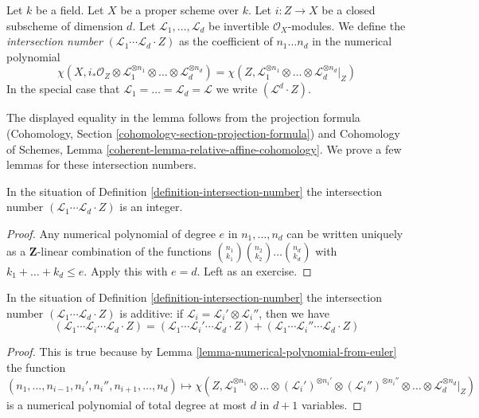 \begin{definition}
\label{definition-intersection-number}
Let $k$ be a field. Let $X$ be a proper scheme over $k$. Let
$i : Z \to X$ be a closed subscheme of dimension $d$. Let
$\mathcal{L}_1, \ldots, \mathcal{L}_d$ be invertible
$\mathcal{O}_X$-modules. We define the {\it intersection number}
$(\mathcal{L}_1 \cdots \mathcal{L}_d \cdot Z)$
as the coefficient of $n_1 \ldots n_d$ in the numerical polynomial
$$
\chi(X, i_*\mathcal{O}_Z \otimes \mathcal{L}_1^{\otimes n_1} \otimes
\ldots \otimes \mathcal{L}_d^{\otimes n_d}) =
\chi(Z, \mathcal{L}_1^{\otimes n_1} \otimes
\ldots \otimes \mathcal{L}_d^{\otimes n_d}|_Z)
$$
In the special
case that $\mathcal{L}_1 = \ldots = \mathcal{L}_d = \mathcal{L}$
we write $(\mathcal{L}^d \cdot Z)$.
\end{definition}

\noindent
The displayed equality in the lemma follows from
the projection formula
(Cohomology, Section \ref{cohomology-section-projection-formula}) and
Cohomology of Schemes, Lemma
\ref{coherent-lemma-relative-affine-cohomology}.
We prove a few lemmas for these intersection numbers.

\begin{lemma}
\label{lemma-intersection-number-integer}
In the situation of Definition \ref{definition-intersection-number}
the intersection number
$(\mathcal{L}_1 \cdots \mathcal{L}_d \cdot Z)$
is an integer.
\end{lemma}

\begin{proof}
Any numerical polynomial of degree $e$ in $n_1, \ldots, n_d$ can be
written uniquely as a $\mathbf{Z}$-linear combination of the functions
${n_1 \choose k_1}{n_2 \choose k_2} \ldots {n_d \choose k_d}$ with
$k_1 + \ldots + k_d \leq e$. Apply this with $e = d$.
Left as an exercise.
\end{proof}

\begin{lemma}
\label{lemma-intersection-number-additive}
In the situation of Definition \ref{definition-intersection-number}
the intersection number
$(\mathcal{L}_1 \cdots \mathcal{L}_d \cdot Z)$
is additive: if $\mathcal{L}_i = \mathcal{L}_i' \otimes \mathcal{L}_i''$,
then we have
$$
(\mathcal{L}_1 \cdots \mathcal{L}_i \cdots \mathcal{L}_d \cdot Z) =
(\mathcal{L}_1 \cdots \mathcal{L}_i' \cdots \mathcal{L}_d \cdot Z) +
(\mathcal{L}_1 \cdots \mathcal{L}_i'' \cdots \mathcal{L}_d \cdot Z)
$$
\end{lemma}

\begin{proof}
This is true because by Lemma \ref{lemma-numerical-polynomial-from-euler}
the function
$$
(n_1, \ldots, n_{i - 1}, n_i', n_i'', n_{i + 1}, \ldots, n_d)
\mapsto
\chi(Z, \mathcal{L}_1^{\otimes n_1} \otimes
\ldots \otimes (\mathcal{L}_i')^{\otimes n_i'} \otimes
(\mathcal{L}_i'')^{\otimes n_i''} \otimes \ldots \otimes
\mathcal{L}_d^{\otimes n_d}|_Z)
$$
is a numerical polynomial of total degree at most $d$ in $d + 1$ variables.
\end{proof}

